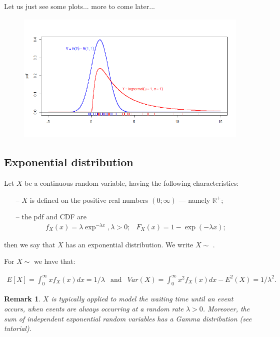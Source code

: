 \documentclass[notes=show,smaller,handout]{beamer}\usepackage[]{graphicx}\usepackage[]{color}
\newtheorem{remark}{Remark}[section]
\newcommand{\bea}{\begin{eqnarray}}
\newcommand{\eea}{\end{eqnarray}}
\newcommand{\nn}{\nonumber}
\begin{document}
\begin{frame}{\subsecname}
  Let us just see some plots... more to come later...
  \begin{figure}[ptb]\centering
  \includegraphics[height=2.4856in, width=4.5in]{img/lognormal_with_rug__8.pdf}%
  \end{figure}
\end{frame}

\subsection{Exponential distribution}

\begin{frame}{\subsecname}
  \begin{definition}
  Let $X$ be a  continuous random variable, having the following  characteristics:
  \begin{itemize}
  \item[--]       $X$ is defined on the positive real numbers $\left( 0;\infty \right) $ --- namely $\mathbb{R}^+$;
  \item[--]       the pdf and CDF are
  \bea
  f_X(x)=\lambda \exp^{ -\lambda x},\lambda
  >0; &
  F_X(x)=1-\exp (-\lambda x); \nn \eea
  \end{itemize}
  then we say that $X$ has an exponential distribution. We write $X\sim$ .
  \end{definition}

  For $X\sim$  we have that:
  \begin{small}
  \bea
  E[X]=\int_{0}^{\infty }xf_X(x )dx= 1/\lambda & \text{and} &   Var(X)=\int_{0}^{\infty }x^{2}f_X(x )dx-E^{2}(X)=1/\lambda ^{2}. \nn
  \eea
  \end{small}

  \begin{remark}
  $X$ is typically applied to model the waiting time until an event occurs, when events are always occurring at a random rate $\lambda >0$. Moreover, the sum of independent exponential random variables has a Gamma distribution (see tutorial).
  \end{remark}
\end{frame}
\end{document}
